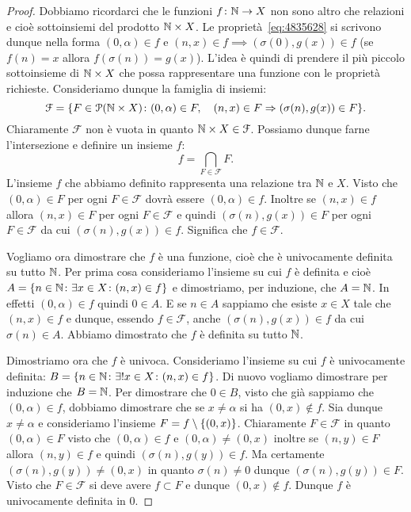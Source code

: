 \begin{proof}
Dobbiamo ricordarci che le funzioni $f\colon {\mathbb N} \to X$ non sono altro che relazioni 
e cioè sottoinsiemi del prodotto ${\mathbb N}\times X$.
Le proprietà~\eqref{eq:4835628} si scrivono dunque nella forma 
$(0,\alpha)\in f$ e $(n,x) \in f \implies (\sigma(0),g(x))\in f$
(se $f(n)=x$ allora $f(\sigma(n))=g(x)$).
L'idea è quindi di prendere il più piccolo sottoinsieme di ${\mathbb N}\times X$ 
che possa rappresentare una funzione con le proprietà richieste.
Consideriamo dunque la famiglia di insiemi:
\[
\mathcal F = {\left\{ F\in \mathcal P({\mathbb N}\times X)\colon 
  (0,\alpha)\in F,\quad (n,x)\in F \Rightarrow (\sigma(n),g(x))\in F \right\}}.
\]
Chiaramente $\mathcal F$ non è vuota in quanto ${\mathbb N}\times X \in \mathcal F$.
Possiamo dunque farne l'intersezione e definire un insieme $f$:
\[
  f = \bigcap_{F\in \mathcal F} F.
\]
L'insieme $f$ che abbiamo definito rappresenta una relazione tra ${\mathbb N}$ e $X$.
Visto che $(0,\alpha)\in F$ per ogni $F\in \mathcal F$ dovrà essere 
$(0,\alpha)\in f$.
Inoltre se $(n,x)\in f$ allora $(n,x)\in F$ per ogni $F\in \mathcal F$ 
e quindi $(\sigma(n),g(x))\in F$ per ogni $F\in \mathcal F$
da cui $(\sigma(n),g(x))\in f$. Significa che $f\in \mathcal F$.

Vogliamo ora dimostrare che $f$ è una funzione, cioè che è univocamente definita 
su tutto ${\mathbb N}$.
Per prima cosa consideriamo l'insieme su cui $f$ è definita 
e cioè $A={\left\{ n\in {\mathbb N}\colon \exists x\in X\colon (n,x)\in f \right\}}$
e dimostriamo, per induzione, che $A={\mathbb N}$.
In effetti $(0,\alpha)\in f$ quindi $0\in A$. 
E se $n\in A$ sappiamo che esiste $x\in X$ tale che $(n,x)\in f$ 
e dunque, essendo $f\in \mathcal F$, anche $(\sigma(n),g(x))\in f$
da cui $\sigma(n)\in A$. 
Abbiamo dimostrato che $f$ è definita su tutto ${\mathbb N}$.

Dimostriamo ora che $f$ è univoca. Consideriamo 
l'insieme su cui $f$ è univocamente definita: 
$B={\left\{ n\in {\mathbb N}\colon \exists! x\in X\colon (n,x)\in f \right\}}$.
Di nuovo vogliamo dimostrare per induzione che $B={\mathbb N}$. 
Per dimostrare che $0\in B$, visto che già sappiamo che $(0,\alpha)\in f$, 
dobbiamo dimostrare che se $x\neq \alpha$ si ha $(0,x)\not\in f$.
Sia dunque $x\neq \alpha$ e consideriamo 
l'insieme $F=f\setminus{\left\{ (0,x) \right\}}$.
Chiaramente $F\in \mathcal F$ in quanto $(0,\alpha)\in F$
visto che $(0,\alpha)\in f$ e $(0,\alpha)\neq (0,x)$
inoltre se $(n,y)\in F$ allora $(n,y)\in f$ 
e quindi $(\sigma(n),g(y)) \in f$.
Ma certamente $(\sigma(n),g(y))\neq (0,x)$ in quanto $\sigma(n)\neq 0$ 
dunque $(\sigma(n),g(y))\in F$.
Visto che $F\in \mathcal F$ si deve avere $f\subset F$ e dunque 
$(0,x)\not \in f$. Dunque $f$ è univocamente definita in $0$.


\end{proof}
